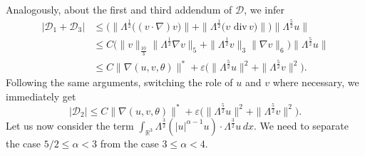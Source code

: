 \documentclass[a4paper]{article}
\newcommand{\dx}{\, dx}
\newcommand{\R}{\mathbb{R}}
\providecommand{\dv}{\,\mathrm{div}\,}
\begin{document}
Analogously, about the first and third addendum of $\mathcal{D}$, we
infer
%
\begin{equation*}
  \begin{aligned}
    |\mathcal{D}_1+\mathcal{D}_3| &\le \big(\|
    \Lambda^{\frac{1}{2}}\big( (v\cdot \nabla) v\big) \|
    +\|\Lambda^{\frac{1}{2}}\big( v \,\dv v\big)\|\big) \|
    \Lambda^{\frac{5}{2}}u\|
    \\
    & \leq C\big(\|v\|_{\frac{10}{3}}\|\Lambda^{\frac{1}{2}}\nabla
    v\|_5 + \|\Lambda^{\frac{1}{2}}v\|_3\|\nabla v\|_6
    \big)\|\Lambda^{\frac{5}{2}}u\|
    \\
    &\le C \|\nabla (u, v, \theta)\|^\ast+ \varepsilon\big(
    \|\Lambda^\frac52 u\|^2+\|\Lambda^\frac52 v\|^2\big).
  \end{aligned}
\end{equation*}
Following the same arguments, switching the role of $u$ and $v$ where
necessary, we immediately get
%
\begin{equation*}
  |\mathcal{D}_2| 
  \le C \|\nabla (u, v, \theta)\|^\ast 
  +  \varepsilon\big( \|\Lambda^\frac52 u\|^2+\|\Lambda^\frac52 v\|^2\big).
\end{equation*}
%
Let us now consider the term
$\int_{\R^3}\Lambda^{\frac{3}{2}}(|u|^{\alpha-1}u)\cdot
\Lambda^{\frac{3}{2}} u \dx$. We need to separate the case
$5/2\le\alpha <3$ from  the case $3\le \alpha <4$.
      
\end{document}
